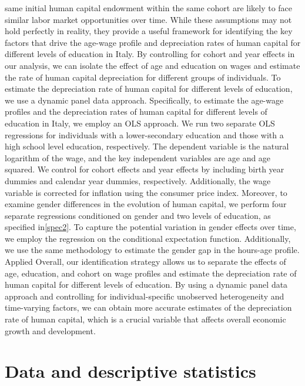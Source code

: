 \documentclass[12pt]{article}
\begin{document}
same initial human capital endowment within the same cohort are likely to face similar labor market opportunities over
time.\newline
While these assumptions may not hold perfectly in reality, they provide a useful framework for identifying the key
factors that drive the age-wage profile and depreciation rates of human capital for different levels of education in
Italy. By controlling for cohort and year effects in our analysis, we can isolate the effect of age and education on
wages and estimate the rate of human capital depreciation for different groups of individuals.
\newline
To estimate the depreciation rate of human capital for different levels of education, we use a dynamic panel data
approach. Specifically, to estimate the age-wage profiles and the depreciation rates of human capital for different
levels of education in Italy, we employ an OLS approach. We run two separate OLS regressions for individuals with a
lower-secondary education and those with a high school level education, respectively. The dependent variable is the
natural logarithm of the wage, and the key independent variables are age and age squared. We control for cohort effects
and year effects by including birth year dummies and calendar year dummies, respectively. Additionally, the wage
variable is corrected for inflation using the consumer price index.
\newline
Moreover, to examine gender differences in the evolution of human capital, we perform four separate regressions
conditioned on gender and two levels of education, as specified in\ref{spec2}. To capture the potential variation in
gender effects over time, we employ the regression on the conditional expectation function. Additionally, we use the
same methodology to estimate the gender gap in the hours-age profile.
\newline
 Applied Overall, our identification strategy allows us to separate the effects of age, education, and cohort on wage
 profiles and estimate the depreciation rate of human capital for different levels of education. By using a dynamic
 panel data approach and controlling for individual-specific unobserved heterogeneity and time-varying factors, we can
 obtain more accurate estimates of the depreciation rate of human capital, which is a crucial variable that affects
 overall economic growth and development.
\section{Data and descriptive statistics}
\end{document}

